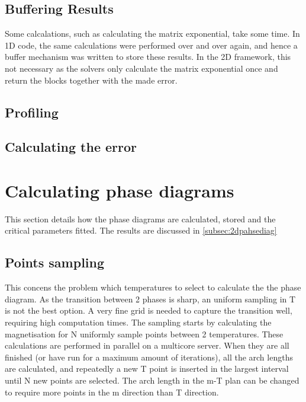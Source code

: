 \subsection{Buffering Results}

Some calcalations, such as calculating the matrix exponential, take some time. In 1D code, the same calculations were performed over and over again, and hence a buffer mechanism was written to store these results. In the 2D framework, this not necessary as the solvers only calculate the matrix exponential once and return the blocks together with the made error.

\subsection{Profiling}

\subsection{Calculating the error}


\section{Calculating phase diagrams} \label{sec:phase_diag}

This section details how the phase diagrams are calculated, stored and the critical parameters fitted. The results are discussed in \cref{subsec:2dpahsediag}

\subsection{Points sampling}

This concens the problem which temperatures to select to calculate the the phase diagram. As  the transition between 2 phases is sharp, an uniform sampling in T is not the best option. A very fine grid is needed to capture the transition well, requiring high computation times.
The sampling starts by calculating the magnetisation for N  uniformly sample points between 2 temperatures. These calculations are performed in parallel on a multicore server. When they are all finished (or have run for a maximum amount of iterations), all the arch lengths are calculated, and repeatedly a new T point is inserted in the largest interval until N new points are selected. The arch length in the m-T plan can be changed to require more points in the m direction than T direction.

